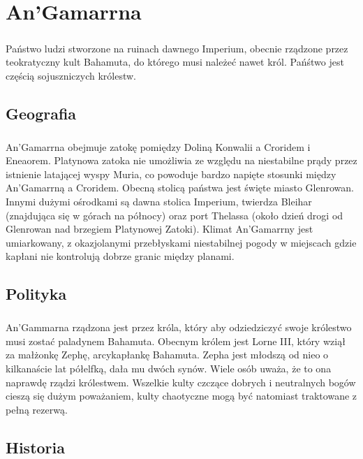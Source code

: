 \documentclass[10pt,twoside,twocolumn]{book}
\begin{document}
\chapter{An'Gamarrna}

\paragraph{}
Państwo ludzi stworzone na ruinach dawnego Imperium, obecnie rządzone przez teokratyczny kult Bahamuta, do którego musi należeć nawet król.
Pańśtwo jest częścią sojuszniczych królestw.

\section{Geografia}
\paragraph{}
An'Gamarrna obejmuje zatokę pomiędzy Doliną Konwalii a Croridem i Eneaorem.
Platynowa zatoka nie umożliwia ze względu na niestabilne prądy przez istnienie latającej wyspy Muria, co powoduje bardzo napięte stosunki między An'Gamarrną a Croridem.
Obecną stolicą państwa jest święte miasto Glenrowan.
Innymi dużymi ośrodkami są dawna stolica Imperium, twierdza Bleihar (znajdująca się w górach na północy) oraz port Thelassa (około dzień drogi od Glenrowan nad brzegiem Platynowej Zatoki).
Klimat An'Gamarrny jest umiarkowany, z okazjolanymi przebłyskami niestabilnej pogody w miejscach gdzie kapłani nie kontrolują dobrze granic między planami.

\section{Polityka}
\paragraph{}
An'Gammarna rządzona jest przez króla, który aby odziedziczyć swoje królestwo musi zostać paladynem Bahamuta.
Obecnym królem jest Lorne III, który wziął za małżonkę Zephę, arcykapłankę Bahamuta.
Zepha jest młodszą od nieo o kilkanaście lat półelfką, dała mu dwóch synów.
Wiele osób uważa, że to ona naprawdę rządzi królestwem.
Wszelkie kulty czczące dobrych i neutralnych bogów cieszą się dużym poważaniem, kulty chaotyczne mogą być natomiast traktowane z pełną rezerwą.

\section{Historia}
\end{document}
